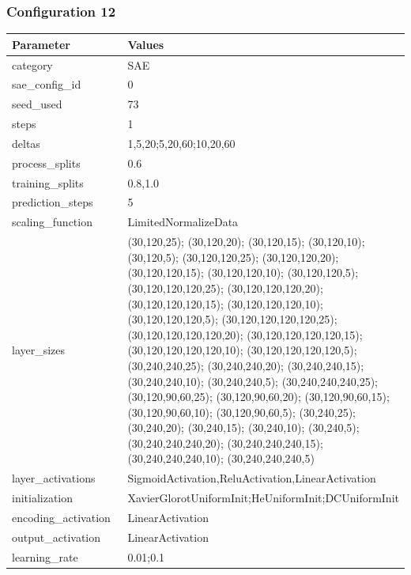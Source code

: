 \documentclass[a4paper,11pt,oneside]{article}
\theoremstyle{plain}
\theoremstyle{definition}
\begin{document}
	\newpage
	\subsubsection{Configuration 12}\label{config12}

	\begin{longtable}[H]{|p{0.3\linewidth}|p{0.7\linewidth}|} \hline \textbf{Parameter} &\textbf{Values} \\\hline{category} & {SAE} \\\hline
		{sae\_config\_id} & {0} \\\hline
		{seed\_used} & {73} \\\hline
		{steps} & {1} \\\hline
		{deltas} & {1,5,20;5,20,60;10,20,60} \\\hline
		{process\_splits} & {0.6} \\\hline
		{training\_splits} & {0.8,1.0} \\\hline
		{prediction\_steps} & {5} \\\hline
		{scaling\_function} & {LimitedNormalizeData} \\\hline
		{layer\_sizes} & {(30,120,25); (30,120,20); (30,120,15); (30,120,10); (30,120,5); (30,120,120,25); (30,120,120,20); (30,120,120,15); (30,120,120,10); (30,120,120,5); (30,120,120,120,25); (30,120,120,120,20); (30,120,120,120,15); (30,120,120,120,10); (30,120,120,120,5); (30,120,120,120,120,25); (30,120,120,120,120,20); (30,120,120,120,120,15); (30,120,120,120,120,10); (30,120,120,120,120,5); (30,240,240,25); (30,240,240,20); (30,240,240,15); (30,240,240,10); (30,240,240,5); (30,240,240,240,25); (30,120,90,60,25); (30,120,90,60,20); (30,120,90,60,15); (30,120,90,60,10); (30,120,90,60,5); (30,240,25); (30,240,20); (30,240,15); (30,240,10); (30,240,5); (30,240,240,240,20); (30,240,240,240,15); (30,240,240,240,10); (30,240,240,240,5)} \\\hline
		{layer\_activations} & {SigmoidActivation,ReluActivation,LinearActivation} \\\hline
		{initialization} & {XavierGlorotUniformInit;HeUniformInit;DCUniformInit} \\\hline
		{encoding\_activation} & {LinearActivation} \\\hline
		{output\_activation} & {LinearActivation} \\\hline
		{learning\_rate} & {0.01;0.1} \\\hline

\end{longtable}
\end{document}

